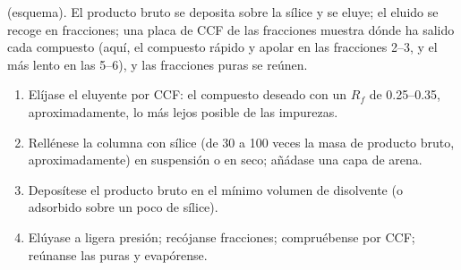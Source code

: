 \begin{omfigure}
\par\vspace{4pt}

{\small {} (esquema). El producto bruto se deposita sobre la sílice y se eluye;
el eluido se recoge en fracciones; una placa de CCF de las fracciones muestra dónde ha salido cada compuesto
(aquí, el compuesto rápido y apolar en las fracciones 2--3, y el más lento en las 5--6), y las fracciones puras se
reúnen.}
\end{omfigure}

\begin{method}\label{met:b2:lab-techniques-2:flash}
\begin{enumerate}
  \item Elíjase el eluyente por CCF: el compuesto deseado con un $R_f$ de 0.25--0.35, aproximadamente, lo más lejos posible de
        las impurezas.
  \item Rellénese la columna con sílice (de 30 a 100 veces la masa de producto bruto, aproximadamente) en suspensión o en seco; añádase una capa
        de arena.
  \item Deposítese el producto bruto en el mínimo volumen de disolvente (o adsorbido sobre un poco de sílice).
  \item Elúyase a ligera presión; recójanse fracciones; compruébense por CCF; reúnanse las puras y
        evapórense.
\end{enumerate}
\end{method}

